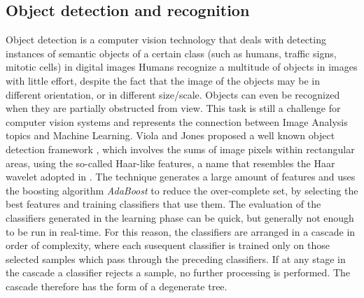 \subsection{Object detection and recognition}

Object detection is a computer vision technology that deals with detecting instances of semantic objects of a certain class (such as humans, traffic signs, mitotic cells) in digital images
Humans recognize a multitude of objects in images with little effort, despite the fact that the image of the objects may be in different orientation,
or in different size/scale. Objects can even be recognized when they are partially obstructed from view.
This task is still a challenge for computer vision systems and represents the connection between Image Analysis topics and Machine Learning.
Viola and Jones proposed a well known object detection framework \cite{objDetect04ViolaJones, objDetect05ViolaJonesRapid}, which involves the sums
of image pixels within rectangular areas, using the so-called Haar-like features, a name that resembles the Haar wavelet adopted in \cite{objDetect03framework}.
The technique generates a large amount of features and uses the boosting algorithm \textit{AdaBoost} to reduce the over-complete set, by selecting the best features and training classifiers that use them.
The evaluation of the classifiers generated in the learning phase can be quick, but generally not enough to be run in real-time. For this reason, the classifiers are arranged in a cascade in order of complexity,
where each susequent classifier is trained only on those selected samples which pass through the preceding classifiers.
If at any stage in the cascade a classifier rejects a sample, no further processing is performed.
The cascade therefore has the form of a degenerate tree.


\vspace{0.5cm}

